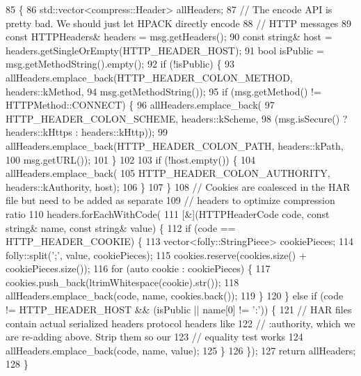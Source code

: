 \begin{DoxyCode}
85                                 \{
86   std::vector<compress::Header> allHeaders;
87   \textcolor{comment}{// The encode API is pretty bad.  We should just let HPACK directly encode}
88   \textcolor{comment}{// HTTP messages}
89   \textcolor{keyword}{const} HTTPHeaders& headers = msg.getHeaders();
90   \textcolor{keyword}{const} \textcolor{keywordtype}{string}& host = headers.getSingleOrEmpty(HTTP\_HEADER\_HOST);
91   \textcolor{keywordtype}{bool} isPublic = msg.getMethodString().empty();
92   \textcolor{keywordflow}{if} (!isPublic) \{
93     allHeaders.emplace\_back(HTTP\_HEADER\_COLON\_METHOD, headers::kMethod,
94                             msg.getMethodString());
95     \textcolor{keywordflow}{if} (msg.getMethod() != HTTPMethod::CONNECT) \{
96       allHeaders.emplace\_back(
97           HTTP\_HEADER\_COLON\_SCHEME, headers::kScheme,
98           (msg.isSecure() ? headers::kHttps : headers::kHttp));
99       allHeaders.emplace\_back(HTTP\_HEADER\_COLON\_PATH, headers::kPath,
100                               msg.getURL());
101     \}
102 
103     \textcolor{keywordflow}{if} (!host.empty()) \{
104       allHeaders.emplace\_back(
105           HTTP\_HEADER\_COLON\_AUTHORITY, headers::kAuthority, host);
106     \}
107   \}
108   \textcolor{comment}{// Cookies are coalesced in the HAR file but need to be added as separate}
109   \textcolor{comment}{// headers to optimize compression ratio}
110   headers.forEachWithCode(
111       [&](HTTPHeaderCode code, \textcolor{keyword}{const} \textcolor{keywordtype}{string}& name, \textcolor{keyword}{const} \textcolor{keywordtype}{string}& value) \{
112         \textcolor{keywordflow}{if} (code == HTTP\_HEADER\_COOKIE) \{
113           vector<folly::StringPiece> cookiePieces;
114           folly::split(\textcolor{charliteral}{';'}, value, cookiePieces);
115           cookies.reserve(cookies.size() + cookiePieces.size());
116           \textcolor{keywordflow}{for} (\textcolor{keyword}{auto} cookie : cookiePieces) \{
117             cookies.push\_back(ltrimWhitespace(cookie).str());
118             allHeaders.emplace\_back(code, name, cookies.back());
119           \}
120         \} \textcolor{keywordflow}{else} \textcolor{keywordflow}{if} (code != HTTP\_HEADER\_HOST && (isPublic || name[0] != \textcolor{charliteral}{':'})) \{
121           \textcolor{comment}{// HAR files contain actual serialized headers protocol headers like}
122           \textcolor{comment}{// :authority, which we are re-adding above.  Strip them so our}
123           \textcolor{comment}{// equality test works}
124           allHeaders.emplace\_back(code, name, value);
125         \}
126       \});
127   \textcolor{keywordflow}{return} allHeaders;
128 \}
\end{DoxyCode}

